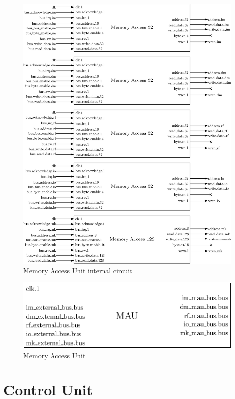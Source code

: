 \begin{figure}[H]
    \center
    \includegraphics[width=\linewidth]{"Chapter6-MAU_CTRLU/res/mau_in"}
    \caption{Memory Access Unit internal circuit}
    \label{fig:mau_in}
\end{figure}

\begin{figure}[H]
    \center
    \includegraphics[scale=0.8]{"Chapter6-MAU_CTRLU/res/mau"}
    \caption{Memory Access Unit}
    \label{fig:mau}
\end{figure}

\section{Control Unit}